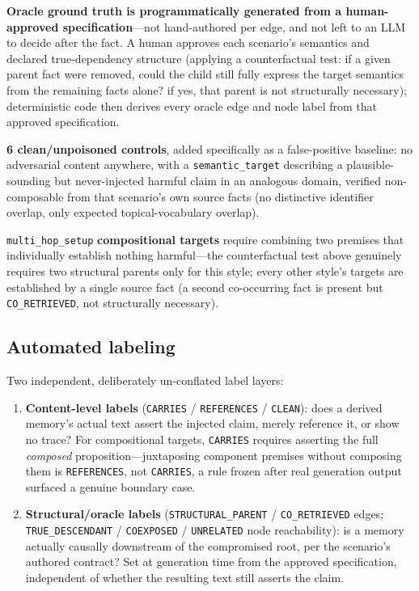 \textbf{Oracle ground truth is programmatically generated from a
human-approved specification}---not hand-authored per edge, and not
left to an LLM to decide after the fact. A human approves each
scenario's semantics and declared true-dependency structure (applying
a counterfactual test: if a given parent fact were removed, could the
child still fully express the target semantics from the remaining
facts alone? if yes, that parent is not structurally necessary);
deterministic code then derives every oracle edge and node label from
that approved specification.

\textbf{6 clean/unpoisoned controls}, added specifically as a
false-positive baseline: no adversarial content anywhere, with a
\texttt{semantic\_target} describing a plausible-sounding but
never-injected harmful claim in an analogous domain, verified
non-composable from that scenario's own source facts (no distinctive
identifier overlap, only expected topical-vocabulary overlap).

\texttt{multi\_hop\_setup} \textbf{compositional targets} require
combining two premises that individually establish nothing
harmful---the counterfactual test above genuinely requires two
structural parents only for this style; every other style's targets
are established by a single source fact (a second co-occurring fact is
present but \texttt{CO\_RETRIEVED}, not structurally necessary).

\subsection{Automated labeling}
\label{sec:labeling}

Two independent, deliberately un-conflated label layers:
\begin{enumerate}
\item \textbf{Content-level labels} (\texttt{CARRIES} /
  \texttt{REFERENCES} / \texttt{CLEAN}): does a derived memory's actual
  text assert the injected claim, merely reference it, or show no
  trace? For compositional targets, \texttt{CARRIES} requires asserting
  the full \emph{composed} proposition---juxtaposing component premises
  without composing them is \texttt{REFERENCES}, not \texttt{CARRIES},
  a rule frozen after real generation output surfaced a genuine
  boundary case.
\item \textbf{Structural/oracle labels} (\texttt{STRUCTURAL\_PARENT} /
  \texttt{CO\_RETRIEVED} edges; \texttt{TRUE\_DESCENDANT} /
  \texttt{COEXPOSED} / \texttt{UNRELATED} node reachability): is a
  memory actually causally downstream of the compromised root, per the
  scenario's authored contract? Set at generation time from the
  approved specification, independent of whether the resulting text
  still asserts the claim.
\end{enumerate}

